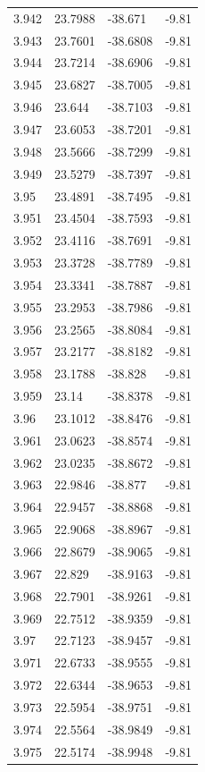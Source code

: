 \begin{tabular}{llll}
3.942 & 23.7988 & -38.671 & -9.81 \\
3.943 & 23.7601 & -38.6808 & -9.81 \\
3.944 & 23.7214 & -38.6906 & -9.81 \\
3.945 & 23.6827 & -38.7005 & -9.81 \\
3.946 & 23.644 & -38.7103 & -9.81 \\
3.947 & 23.6053 & -38.7201 & -9.81 \\
3.948 & 23.5666 & -38.7299 & -9.81 \\
3.949 & 23.5279 & -38.7397 & -9.81 \\
3.95 & 23.4891 & -38.7495 & -9.81 \\
3.951 & 23.4504 & -38.7593 & -9.81 \\
3.952 & 23.4116 & -38.7691 & -9.81 \\
3.953 & 23.3728 & -38.7789 & -9.81 \\
3.954 & 23.3341 & -38.7887 & -9.81 \\
3.955 & 23.2953 & -38.7986 & -9.81 \\
3.956 & 23.2565 & -38.8084 & -9.81 \\
3.957 & 23.2177 & -38.8182 & -9.81 \\
3.958 & 23.1788 & -38.828 & -9.81 \\
3.959 & 23.14 & -38.8378 & -9.81 \\
3.96 & 23.1012 & -38.8476 & -9.81 \\
3.961 & 23.0623 & -38.8574 & -9.81 \\
3.962 & 23.0235 & -38.8672 & -9.81 \\
3.963 & 22.9846 & -38.877 & -9.81 \\
3.964 & 22.9457 & -38.8868 & -9.81 \\
3.965 & 22.9068 & -38.8967 & -9.81 \\
3.966 & 22.8679 & -38.9065 & -9.81 \\
3.967 & 22.829 & -38.9163 & -9.81 \\
3.968 & 22.7901 & -38.9261 & -9.81 \\
3.969 & 22.7512 & -38.9359 & -9.81 \\
3.97 & 22.7123 & -38.9457 & -9.81 \\
3.971 & 22.6733 & -38.9555 & -9.81 \\
3.972 & 22.6344 & -38.9653 & -9.81 \\
3.973 & 22.5954 & -38.9751 & -9.81 \\
3.974 & 22.5564 & -38.9849 & -9.81 \\
3.975 & 22.5174 & -38.9948 & -9.81 \\

\end{tabular}
